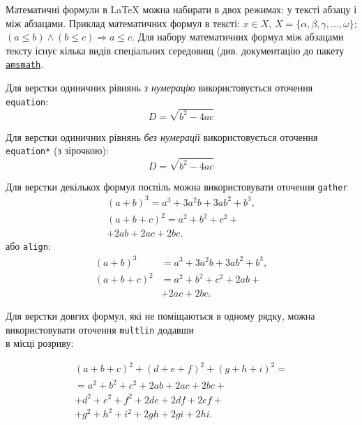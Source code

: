\documentclass[]{iptconf}
\begin{document}
Математичні формули в \LaTeX{} можна набирати в двох режимах: у тексті абзацу і між абзацами.
Приклад математичних формул в тексті: $x \in X$, $X = \{\alpha, \beta, \gamma, \dots,
	\omega\}$; $(a \le b) \wedge (b \le c) \Rightarrow a \le c$. Для набору математичних формул
між абзацами тексту існує кілька видів спеціальних середовищ (див. документацію до пакету
\href{http://mirror.ctan.org/macros/latex/required/amslatex/math/amsldoc.pdf}{\texttt{amsmath}}.

Для верстки одиничних рівнянь \textit{з нумерацію} використовується оточення \texttt{equation}:
\begin{equation}
	\label{eq:Diskriminant} %
	D = \sqrt {{b^2} - 4ac}
\end{equation}

Для верстки одиничних рівнянь \textit{без нумерації} використовується оточення \texttt{equation*}
(з зірочкою):
\begin{equation*}
	D = \sqrt {{b^2} - 4ac}
\end{equation*}

Для верстки декількох формул поспіль можна використовувати оточення \texttt{gather}
\begin{gather}
	(a+b)^3 = a^3 + 3a^2b + 3ab^2 + b^3,\\
	(a+b+c)^2 = a^2 + b^2 + c^2 +\nonumber\\
	+ 2ab + 2ac + 2bc.
\end{gather}
або \texttt{align}:
\begin{align}\label{eq:aligned_equation}
	(a+b)^3   & = a^3 + 3a^2b + 3ab^2 + b^3,        \\
	(a+b+c)^2 & = a^2 + b^2 + c^2 + 2ab + \nonumber \\
	          & + 2ac + 2bc.
\end{align}

Для верстки довгих формул, які не поміщаються в одному рядку, можна використовувати
оточення \texttt{multlin} додавши \texttt{\string\\} в місці розриву:

\begin{multline}\label{eq:multined_equation}
	(a+b+c)^2 + (d+e+f)^2 + (g+h+i)^2 = \\
	= a^2 + b^2 + c^2 + 2ab + 2ac + 2bc +\\
	+d^2 + e^2 + f^2 + 2de + 2df + 2ef +\\
	+g^2 + h^2 + i^2 + 2gh + 2gi + 2hi.
\end{multline}
\end{document}
